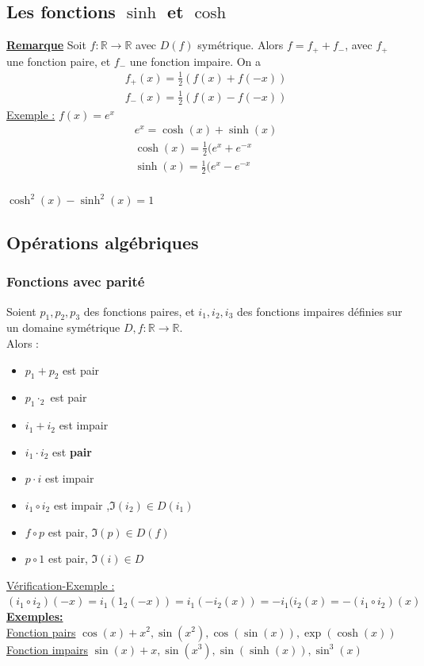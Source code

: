 \documentclass[12pt,a4paper]{article}
\newcommand{\evid}[1]{\textbf{\underline{#1}}}
\newcommand{\R}{\ensuremath{\mathbb{R}} }
\newcommand{\rtor}{\ensuremath{\R \to \R} }
\begin{document}
{\subsection{Les fonctions $\sinh$ et $\cosh$}
\evid{Remarque} Soit $f:\rtor$ avec $D(f)$ symétrique. Alors $f =  f_+ + f_-$, avec $f_+$ une fonction paire, et $f_-$ une fonction impaire. On a
\begin{align*}
	f_+(x) = \frac{1}{2}(f(x) + f(-x))\\
	f_-(x) = \frac{1}{2}(f(x)-f(-x))
\end{align*}
\underline{Exemple :} $f(x) = e^x$
\begin{align*}
	e^x = \cosh(x) + \sinh(x)\\
	\cosh(x) = \frac{1}{2}(e^x+e^{-x}\\
	\sinh(x) = \frac{1}{2}(e^x-e^{-x}\\
\end{align*}
\begin{boite}[0.3]
	$\cosh^2(x)-\sinh^2(x) = 1$
\end{boite}
\subsection{Opérations algébriques}
\subsubsection{Fonctions avec parité}
Soient $p_1,p_2,p_3$ des fonctions paires, et $i_1,i_2,i_3$ des fonctions impaires définies sur un domaine symétrique $D, f:\rtor$.\\
Alors :
\begin{itemize}
	\item $p_1+p_2$ est pair
	\item $p_1\cdotp_2$ est pair
	\item $i_1+i_2$ est impair
	\item $i_1\cdot i_2$ est \textbf{pair}
	\item $p\cdot i$ est impair
	\item $i_1 \circ i_2$ est impair ,$\Im(i_2) \in D(i_1)$
	\item $f\circ p$ est pair, $\Im(p) \in D(f)$
	\item $p \circ 1$ est pair, $\Im(i) \in D$
\end{itemize}
\underline{Vérification-Exemple :} $(i_1\circ i_2)(-x) = i_1(1_2(-x)) = i_1(-i_2(x)) = -i_1(i_2(x) = -(i_1\circ i_2)(x)$\\
\evid{Exemples:}\\
\underline{Fonction pairs} $\cos(x) + x^2, \sin(x^2), \cos(\sin(x)), \exp(\cosh(x))$\\
\underline{Fonction impairs} $\sin(x) + x, \sin(x^3),  \sin(\sinh(x)), \sin^3(x)$
}
\end{document}
